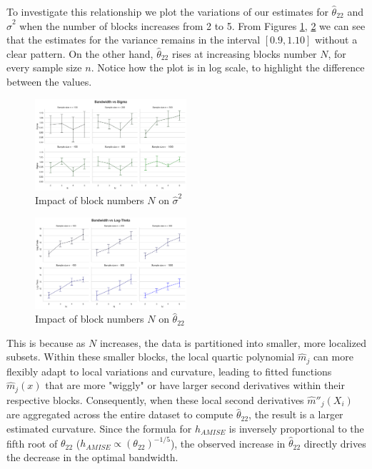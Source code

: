\documentclass{article}
\begin{document}
To investigate this relationship we plot the variations of our estimates for $\hat{\theta}_{22}$ and $\hat{\sigma}^2$ when the number of blocks
increases from 2 to 5. From Figures \ref{fig:sigma}, \ref{fig:theta} we can see that the estimates for the variance remains in the interval $[0.9,1.10]$ without a clear pattern. On the other hand, $\hat{\theta}_{22}$
rises at increasing blocks number $N$, for every sample size $n$. Notice how the plot is in log scale, to highlight the difference between the values.


\begin{figure}[H]
\centering
\includegraphics[width=0.5\textwidth]{N_vs_sigma.png}
\caption{Impact of block numbers $N$ on $\hat{\sigma}^2$}
\label{fig:sigma}
\end{figure}

\begin{figure}[H]
\centering
\includegraphics[width=0.5\textwidth]{N_vs_theta.png}
\caption{Impact of block numbers $N$ on $\hat{\theta}_{22}$}
\label{fig:theta}
\end{figure}

This is because as $N$ increases, the data is partitioned into smaller, more localized subsets. 
Within these smaller blocks, the local quartic polynomial $\hat{m}_j$ can more flexibly adapt 
to local variations and curvature, leading to fitted functions $\hat{m}_j(x)$ that are more 
"wiggly" or have larger second derivatives within their respective blocks. Consequently, when 
these local second derivatives $\hat{m}''_j(X_i)$ are aggregated across the entire dataset to 
compute $\hat{\theta}_{22}$, the result is a larger estimated curvature. Since the formula for 
$h_{AMISE}$ is inversely proportional to the fifth root of $\theta_{22}$ ($h_{AMISE} \propto 
(\theta_{22})^{-1/5}$), the observed increase in $\hat{\theta}_{22}$ directly drives the 
decrease in the optimal bandwidth.
\end{document}
